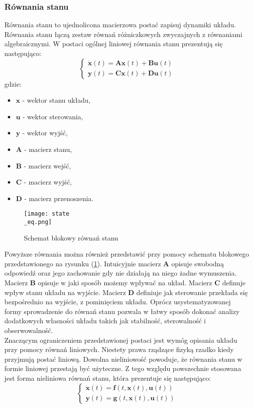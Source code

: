 \subsubsection{Równania stanu}

Równania stanu to ujednolicona macierzowa postać zapisuj dynamiki układu. Równania stanu łączą zestaw równań różniczkowych zwyczajnych z równaniami algebraicznymi. W postaci ogólnej liniowej równania stanu prezentują się następująco:
\[
	\begin{cases}
		\dot{\bm{x}} \left(t\right)  = \bm{Ax} \left(t\right)  + \bm{Bu} \left(t\right) \\
		\bm{y} \left(t\right) = \bm{Cx} \left(t\right) + \bm{Du} \left(t\right)
	\end{cases}
\]
gdzie:
\begin{itemize}
\item $\bm{x}$ - wektor stanu układu,
\item $\bm{u}$ - wektor sterowania,
\item $\bm{y}$ - wektor wyjść,
\item $\bm{A}$ - macierz stanu,
\item $\bm{B}$ - macierz wejść,
\item $\bm{C}$ - macierz wyjść,
\item $\bm{D}$ - macierz przenoszenia.
\end{itemize}




\begin{figure}[!h]
   	\centering
      	\texttt{[image: state\\\_eq.png]}
      	\caption{Schemat blokowy równań stanu}
      	\label{rnie_stanu}
\end{figure}

Powyższe równania można również przedstawić przy pomocy schematu blokowego przedstawionego na rysunku (\ref{rnie_stanu}).
Intuicyjnie macierz  $\bm{A}$ opisuje swobodną odpowiedź oraz jego zachowanie gdy nie działają na niego żadne wymuszenia. Macierz $\bm{B}$ opisuje w jaki sposób możemy wpływać na układ. Macierz $\bm{C}$ definuje wpływ stanu układu na wyjście. Macierz $\bm{D}$ definiuje jak sterowanie przekłada się bezpośrednio na wyjście, z pominięciem układu. Oprócz usystematyzowanej formy sprowadzenie do równań stanu pozwala w łatwy sposób dokonać analizy dodatkowych własności układu takich jak stabilność, sterowalność i obserwowalność.\\

Znaczącym ograniczeniem przedstawionej postaci jest wymóg opisania układu przy pomocy równań liniowych. Niestety prawa rządzące fizyką rzadko kiedy przyjmują postać liniową. Dowolna nieliniowość powoduje, że równania stanu w formie liniowej przestają być użyteczne. Z tego względu powszechnie stosowana jest forma nieliniowa równań stanu, która prezentuje się następująco:
\[
	\begin{cases}
		\dot{\bm{x}} \left(t\right)  =  \bm{f}  \left( t, \bm{x} \left(t\right)  , \bm{u} \left(t\right) \right) \\
		\bm{y} \left(t\right) = \bm{g}  \left( t, \bm{x} \left(t\right) , \bm{u} \left(t\right) \right)
	\end{cases}
\]

